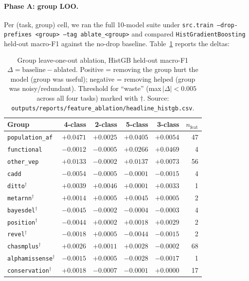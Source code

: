 \documentclass[11pt,a4paper]{article}
\begin{document}
\paragraph{Phase A: group LOO.}
Per (task, group) cell, we ran the full 10-model suite under
\texttt{src.train --drop-prefixes <group> --tag ablate\_<group>} and
compared \texttt{HistGradientBoosting} held-out macro-F1 against the
no-drop baseline. Table~\ref{tab:ablation-headline} reports the deltas:

\begin{table}[H]
\centering
\caption{Group leave-one-out ablation, HistGB held-out macro-F1
$\Delta = \text{baseline} - \text{ablated}$. Positive = removing the
group hurt the model (group was useful); negative = removing helped
(group was noisy/redundant). Threshold for ``waste'' (max\,$|\Delta|<0.005$
across all four tasks) marked with $\dagger$. Source:
\texttt{outputs/reports/feature\_ablation/headline\_histgb.csv}.}
\label{tab:ablation-headline}
\small
\begin{tabular}{lrrrrr}
\toprule
Group & 4-class & 2-class & 5-class & 3-class & $n_{\text{feat}}$ \\
\midrule
\texttt{population\_af}            & $+0.0471$ & $+0.0025$ & $+0.0405$ & $+0.0054$ & 47 \\
\texttt{functional}                & $-0.0012$ & $-0.0005$ & $+0.0266$ & $+0.0469$ & 4  \\
\texttt{other\_vep}                & $+0.0133$ & $-0.0002$ & $+0.0137$ & $+0.0073$ & 56 \\
\texttt{cadd}                      & $-0.0054$ & $-0.0005$ & $-0.0001$ & $-0.0015$ & 4  \\
\texttt{ditto}$^\dagger$           & $+0.0039$ & $+0.0046$ & $+0.0001$ & $+0.0033$ & 1  \\
\texttt{metarnn}$^\dagger$         & $+0.0014$ & $+0.0005$ & $+0.0045$ & $+0.0005$ & 2  \\
\texttt{bayesdel}$^\dagger$        & $-0.0045$ & $-0.0002$ & $-0.0004$ & $-0.0003$ & 4  \\
\texttt{position}$^\dagger$        & $-0.0044$ & $+0.0002$ & $+0.0018$ & $+0.0029$ & 2  \\
\texttt{revel}$^\dagger$           & $-0.0018$ & $+0.0005$ & $-0.0044$ & $-0.0015$ & 2  \\
\texttt{chasmplus}$^\dagger$       & $+0.0026$ & $+0.0011$ & $+0.0028$ & $-0.0002$ & 68 \\
\texttt{alphamissense}$^\dagger$   & $-0.0015$ & $+0.0005$ & $-0.0028$ & $-0.0017$ & 1  \\
\texttt{conservation}$^\dagger$    & $+0.0018$ & $-0.0007$ & $-0.0001$ & $+0.0000$ & 17 \\
\bottomrule
\end{tabular}
\end{table}
\end{document}
